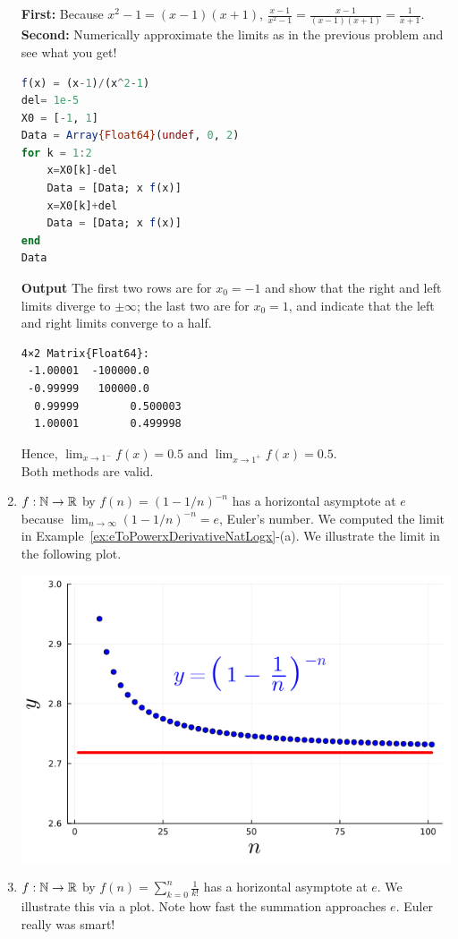 \begin{enumerate}
    \textbf{First: } Because $x^2 - 1 = (x-1)(x+1)$, $ \frac{x-1}{x^2 - 1} =  \frac{x-1}{(x-1)(x+1)}= \frac{1}{x+1}$. \\
    
    \textbf{Second: } Numerically approximate the limits as in the previous problem and see what you get! \\
    \begin{lstlisting}[language=Julia,style=mystyle]
f(x) = (x-1)/(x^2-1)
del= 1e-5
X0 = [-1, 1]
Data = Array{Float64}(undef, 0, 2)
for k = 1:2
    x=X0[k]-del
    Data = [Data; x f(x)]
    x=X0[k]+del
    Data = [Data; x f(x)]
end
Data
\end{lstlisting}
\textbf{Output} The first two rows are for $x_0 = -1$ and show that the right and left limits diverge to $\pm \infty$; the last two are for $x_0 = 1$, and indicate that the left and right limits converge to a half.
\begin{verbatim}
4×2 Matrix{Float64}:
 -1.00001  -100000.0
 -0.99999   100000.0
  0.99999        0.500003
  1.00001        0.499998
\end{verbatim}
Hence, $\displaystyle \lim_{x \to 1^{-}} f(x) = 0.5$ and $\displaystyle \lim_{x \to 1^{+}} f(x) = 0.5$. \\

Both methods are valid.

\item \Ans $f: \mathbb N \to \mathbb R$ by $f(n)=(1 - 1/n)^{-n}$ has a horizontal asymptote at $e$ because $\displaystyle \lim_{n \to \infty} (1 - 1/n)^{-n} = e$, Euler's number. We computed the limit in Example~\ref{ex:eToPowerxDerivativeNatLogx}-(a). We illustrate the limit in the following plot.

    \begin{center}
    \includegraphics[width=0.45\columnwidth]{graphics/Chap04/BoundsAsymptotesG.png}
    \end{center}

\item \Ans $f: \mathbb N \to \mathbb R$ by $f(n)= \sum_{k=0}^n\frac{1}{k !}$ has a horizontal asymptote at $e$. We illustrate this via a plot. Note how fast the summation approaches $e$. Euler really was smart!


\end{enumerate}

